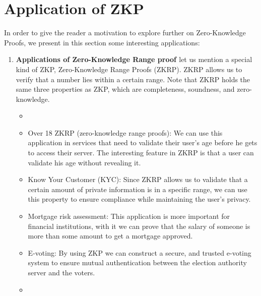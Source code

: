\documentclass[10pt,a4paper]{article}
\begin{document}
	\section{Application of ZKP}
	In order to give the reader a motivation to explore further on Zero-Knowledge Proofs, we present in this section some interesting applications:
	\begin{enumerate}
		\item
		\begin{enumerate}
			\textbf{Applications of Zero-Knowledge Range proof \cite{morais2019survey:19}}
			let us mention a special kind of ZKP, Zero-Knowledge Range Proofs (ZKRP). ZKRP allows us to verify that a number lies within a certain range. Note that ZKRP holds the same three properties as ZKP, which are completeness, soundness, and zero-knowledge.
			\begin{itemize}
				\item
				\item Over 18 ZKRP (zero-knowledge range proofs):
				We can use this application in services that need to validate their user’s age before he gets to access their server. The interesting feature in ZKRP is that a user can validate his age without revealing it.
				\item 
				Know Your Customer (KYC):
				Since ZKRP allows us to validate that a certain amount of private information is in a specific range, we can use this property to ensure compliance while maintaining the user’s privacy.
				\item 
				
				Mortgage risk assessment:
				This application is more important for financial institutions, with it we can prove that the salary of someone is more than some amount to get a mortgage approved.
				\item 
				
				E-voting:
				By using ZKP we can construct a secure, and trusted e-voting system to ensure mutual authentication between the election authority server and the voters.
					\item 
				

\end{itemize}
\end{enumerate}
\end{enumerate}
\end{document}
